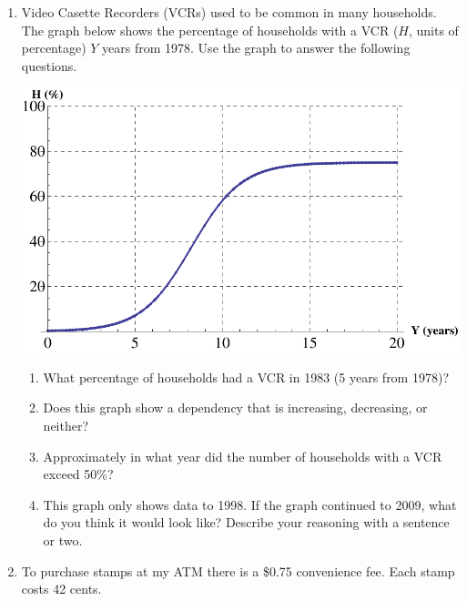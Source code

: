 \documentclass[12pt]{article}
\begin{document}
\hrulefill


\newpage
\begin{enumerate}
\item Video Casette Recorders (VCRs) used to be common in many households.  The graph below shows the percentage of households with a VCR ($H$, units of percentage) $Y$ years from 1978.  Use the graph to answer the following questions.

\begin{center}
 {\includegraphics [width = 8in] {vcr}}
\end{center}



\begin{enumerate}
\item What percentage of households had a VCR in 1983 (5 years from 1978)?
\vfill
\item Does this graph show a dependency that is increasing, decreasing, or neither?
\vfill
\item Approximately in what year did the number of households with a VCR exceed 50\%?
\vfill
\item This graph only shows data to 1998.  If the graph continued to 2009, what do you think it would look like?  Describe your reasoning with a sentence or two.
\vfill
\end{enumerate}
\newpage
\item  To purchase stamps at my ATM there is a \$0.75 convenience fee.  Each stamp costs 42 cents.   


\end{enumerate}
\end{document}

